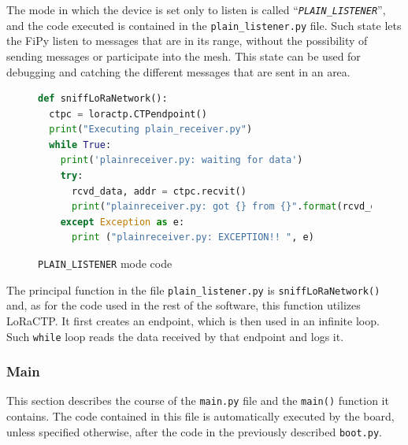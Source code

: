 				The mode in which the device is set only to listen is called ``\textit{\texttt{PLAIN\_LISTENER}}'', and the code executed is contained in the \texttt{plain\_listener.py} file.
				Such state lets the FiPy listen to messages that are in its range, without the possibility of sending messages or participate into the mesh.
				This state can be used for debugging and catching the different messages that are sent in an area.
				
				\begin{figure}[H]
					\begin{lstlisting}[language=python]
def sniffLoRaNetwork():
  ctpc = loractp.CTPendpoint()
  print("Executing plain_receiver.py")
  while True:
    print('plainreceiver.py: waiting for data')
    try:
      rcvd_data, addr = ctpc.recvit()
      print("plainreceiver.py: got {} from {}".format(rcvd_data, addr))
    except Exception as e:
      print ("plainreceiver.py: EXCEPTION!! ", e)
					\end{lstlisting}
					\caption{\texttt{PLAIN\_LISTENER} mode code}
					\label{code:plain_listener}
				\end{figure}
				
				The principal function in the file \texttt{plain\_listener.py} is \texttt{sniffLoRaNetwork()} and, as for the code used in the rest of the software, this function utilizes LoRaCTP.
				It first creates an endpoint, which is then used in an infinite loop.
				Such \texttt{while} loop reads the data received by that endpoint and logs it.
			
			\subsubsection{Main}
			
				This section describes the course of the \texttt{main.py} file and the \texttt{main()} function it contains.
				The code contained in this file is automatically executed by the board, unless specified otherwise, after the code in the previously described \texttt{boot.py}.
				
